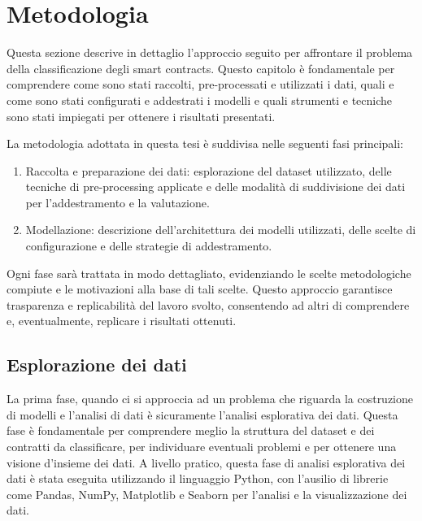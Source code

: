 \documentclass[../../Thesis.tex]{subfiles}
\begin{document}
\chapter{Metodologia}
Questa sezione descrive in dettaglio l'approccio seguito per affrontare il problema della classificazione degli smart contracts. Questo capitolo \`e fondamentale per comprendere come sono stati raccolti, pre-processati e utilizzati i dati, quali e come sono stati configurati e addestrati i modelli e quali strumenti e tecniche sono stati impiegati per ottenere i risultati presentati.

La metodologia adottata in questa tesi \`e suddivisa nelle seguenti fasi principali:
\begin{enumerate}
    \item Raccolta e preparazione dei dati: esplorazione del dataset utilizzato, delle tecniche di pre-processing applicate e delle modalit\`a di suddivisione dei dati per l'addestramento e la valutazione.
    \item Modellazione: descrizione dell'architettura dei modelli utilizzati, delle scelte di configurazione e delle strategie di addestramento.
\end{enumerate}
Ogni fase sar\`a trattata in modo dettagliato, evidenziando le scelte metodologiche compiute e le motivazioni alla base di tali scelte. Questo approccio  garantisce trasparenza e replicabilit\`a del lavoro svolto, consentendo ad altri  di comprendere e, eventualmente, replicare i risultati ottenuti.
    
\section{Esplorazione dei dati}
\label{sec:eda}
La prima fase, quando ci si approccia ad un problema che riguarda la costruzione di modelli e l'analisi di dati \`e sicuramente l'analisi esplorativa dei dati. Questa fase \`e fondamentale per comprendere meglio la struttura del dataset e dei contratti da classificare, per individuare eventuali problemi e per ottenere una visione d'insieme dei dati. A livello pratico, questa fase di analisi esplorativa dei dati \`e stata eseguita utilizzando il linguaggio Python, con l'ausilio di librerie come Pandas, NumPy, Matplotlib e Seaborn per l'analisi e la visualizzazione dei dati.
\end{document}
